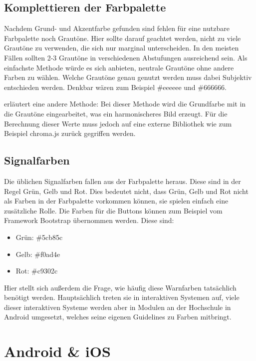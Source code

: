 \subsection{Komplettieren der Farbpalette}

Nachdem Grund- und Akzentfarbe gefunden sind fehlen für eine nutzbare Farbpalette noch Grautöne.  Hier sollte darauf geachtet werden, nicht zu viele Grautöne zu verwenden, die sich nur marginal unterscheiden. In den meisten Fällen sollten 2-3 Grautöne in verschiedenen Abstufungen ausreichend sein.
Als einfachste Methode würde es sich anbieten, neutrale Grautöne ohne andere Farben zu wählen. Welche Grautöne genau genutzt werden muss dabei Subjektiv entschieden werden. Denkbar wären zum Beispiel \#eeeeee und \#666666.

\cite{elizabeth2016simple} erläutert eine andere Methode: Bei dieser Methode wird die Grundfarbe mit in die Grautöne eingearbeitet, was ein harmonischeres Bild erzeugt.  Für die Berechnung dieser Werte muss jedoch auf eine externe Bibliothek wie zum Beispiel chroma.js zurück gegriffen werden.

\subsection{Signalfarben}
Die üblichen Signalfarben fallen aus der Farbpalette heraus. Diese sind in der Regel Grün, Gelb und Rot. Dies bedeutet nicht, dass Grün, Gelb und Rot nicht als Farben in der Farbpalette vorkommen können, sie spielen einfach eine zusätzliche Rolle. Die Farben für die Buttons können zum Beispiel vom Framework Bootstrap übernommen werden. Diese sind:

\begin{itemize}
  \item Grün: \#5cb85c
  \item Gelb: \#f0ad4e
  \item Rot: \#c9302c
\end{itemize}

Hier stellt sich außerdem die Frage, wie häufig diese Warnfarben tatsächlich benötigt werden. Hauptsächlich treten sie in interaktiven Systemen auf, viele dieser interaktiven Systeme werden aber in Modulen an der Hochschule in Android umgesetzt, welches seine eigenen Guidelines zu Farben mitbringt.


\section{Android \& iOS}

